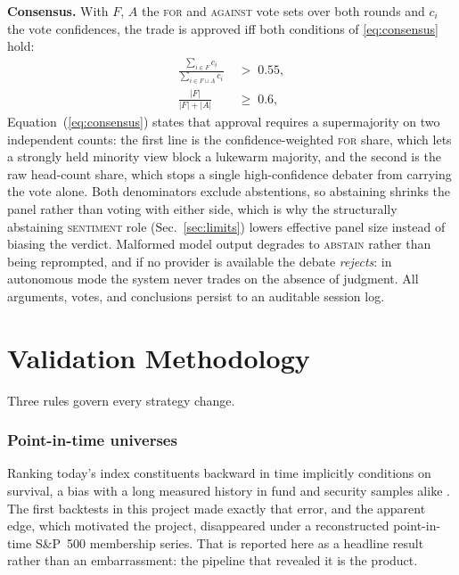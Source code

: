 \documentclass[10pt,twocolumn]{IEEEtran}
\begin{document}
\textbf{Consensus.} With $F$, $A$ the \textsc{for} and \textsc{against} vote
sets over both rounds and $c_i$ the vote confidences, the trade is approved iff
both conditions of \eqref{eq:consensus} hold:
\begin{equation}
\label{eq:consensus}
\begin{aligned}
\frac{\sum_{i \in F} c_i}{\sum_{i \in F \cup A} c_i} \;&>\; 0.55,\\[2pt]
\frac{|F|}{|F| + |A|} \;&\geq\; 0.6,
\end{aligned}
\end{equation}
Equation~(\ref{eq:consensus}) states that approval requires a supermajority on
two independent counts: the first line is the confidence-weighted \textsc{for}
share, which lets a strongly held minority view block a lukewarm majority, and
the second is the raw head-count share, which stops a single high-confidence
debater from carrying the vote alone. Both denominators exclude abstentions, so
abstaining shrinks the panel rather than voting with either side, which is why
the structurally abstaining \textsc{sentiment} role (Sec.~\ref{sec:limits})
lowers effective panel size instead of biasing the verdict. Malformed model
output
degrades to \textsc{abstain} rather than being reprompted, and if no
provider is available the debate \emph{rejects}: in autonomous mode the
system never trades on the absence of judgment. All arguments, votes, and
conclusions persist to an auditable session log.

\section{Validation Methodology}
\label{sec:method}

Three rules govern every strategy change.

\subsubsection{Point-in-time universes} Ranking today's index constituents
backward in time implicitly conditions on survival, a bias with a long
measured history in fund and security samples alike
\cite{elton1996survivorship,shumway1997delisting}. The first backtests in this
project made exactly that error, and the apparent edge, which motivated the
project, disappeared under a reconstructed point-in-time S\&P~500
membership series. That is reported here as a headline result rather than an
embarrassment: the pipeline that revealed it is the product.
\end{document}
